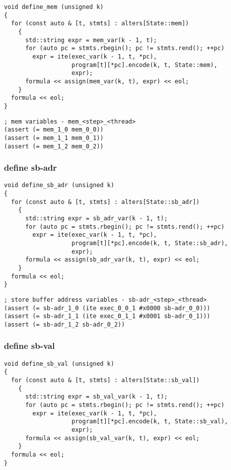 \begin{lstlisting}[style=c++]
void define_mem (unsigned k)
{
  for (const auto & [t, stmts] : alters[State::mem])
    {
      std::string expr = mem_var(k - 1, t);
      for (auto pc = stmts.rbegin(); pc != stmts.rend(); ++pc)
        expr = ite(exec_var(k - 1, t, *pc),
                   program[t][*pc].encode(k, t, State::mem),
                   expr);
      formula << assign(mem_var(k, t), expr) << eol;
    }
  formula << eol;
}
\end{lstlisting}

\begin{lstlisting}[language=SMTLib]
; mem variables - mem_<step>_<thread>
(assert (= mem_1_0 mem_0_0))
(assert (= mem_1_1 mem_0_1))
(assert (= mem_1_2 mem_0_2))
\end{lstlisting}

\subsubsection{define sb-adr}

\begin{lstlisting}[style=c++]
void define_sb_adr (unsigned k)
{
  for (const auto & [t, stmts] : alters[State::sb_adr])
    {
      std::string expr = sb_adr_var(k - 1, t);
      for (auto pc = stmts.rbegin(); pc != stmts.rend(); ++pc)
        expr = ite(exec_var(k - 1, t, *pc),
                   program[t][*pc].encode(k, t, State::sb_adr),
                   expr);
      formula << assign(sb_adr_var(k, t), expr) << eol;
    }
  formula << eol;
}
\end{lstlisting}

\begin{lstlisting}[language=SMTLib]
; store buffer address variables - sb-adr_<step>_<thread>
(assert (= sb-adr_1_0 (ite exec_0_0_1 #x0000 sb-adr_0_0)))
(assert (= sb-adr_1_1 (ite exec_0_1_1 #x0001 sb-adr_0_1)))
(assert (= sb-adr_1_2 sb-adr_0_2))
\end{lstlisting}

\subsubsection{define sb-val}

\begin{lstlisting}[style=c++]
void define_sb_val (unsigned k)
{
  for (const auto & [t, stmts] : alters[State::sb_val])
    {
      std::string expr = sb_val_var(k - 1, t);
      for (auto pc = stmts.rbegin(); pc != stmts.rend(); ++pc)
        expr = ite(exec_var(k - 1, t, *pc),
                   program[t][*pc].encode(k, t, State::sb_val),
                   expr);
      formula << assign(sb_val_var(k, t), expr) << eol;
    }
  formula << eol;
}
\end{lstlisting}

